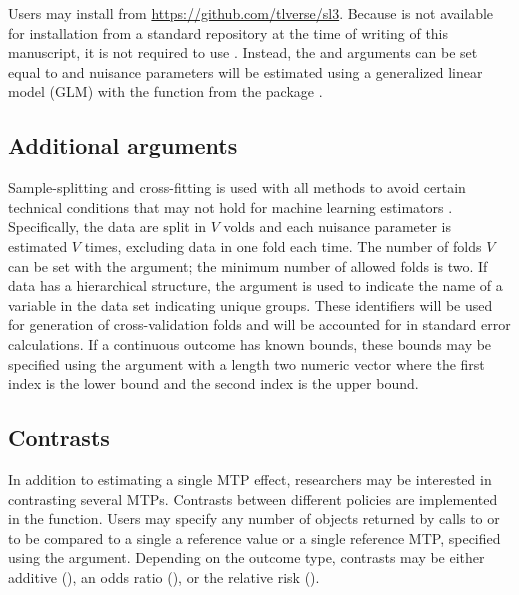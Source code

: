 \documentclass[]{jss}
\begin{document}
Users may install  from \url{https://github.com/tlverse/sl3}.
Because  is not available for installation from a standard
repository at the time of writing of this manuscript, it is not
required to use . Instead, the  and
 arguments can be set equal to  and
nuisance parameters will be estimated using a generalized linear model
(GLM) with the  function from the  package
\citep{rcore}.

\hypertarget{additional-arguments}{%
\subsection{Additional arguments}\label{additional-arguments}}

Sample-splitting and cross-fitting is used with all methods to avoid
certain technical conditions that may not hold for machine learning
estimators \citep{zhengCrossValidatedTargetedMinimumLossBased2011b,
  chernozhukovDoubleDebiasedMachine2018}. Specifically, the data are
split in $V$ volds and each nuisance parameter is estimated $V$ times,
excluding data in one fold each time. The number of folds $V$ can be
set with the  argument; the minimum number of allowed
folds is two.  If data has a hierarchical structure, the 
argument is used to indicate the name of a variable in the data set
indicating unique groups. These identifiers will be used for
generation of cross-validation folds and will be accounted for in
standard error calculations. If a continuous outcome has known bounds,
these bounds may be specified using the  argument with a
length two numeric vector where the first index is the lower bound and
the second index is the upper bound.

\hypertarget{contrasts}{%
\subsection{Contrasts}\label{contrasts}}

In addition to estimating a single MTP effect, researchers may be
interested in contrasting several MTPs. Contrasts between different
policies are implemented in the  function. Users
may specify any number of objects returned by calls to
 or  to be compared to a single a
reference value or a single reference MTP, specified using the
 argument.  Depending on the outcome type, contrasts may be
either additive (), an odds ratio (), or the relative risk ().
\end{document}
